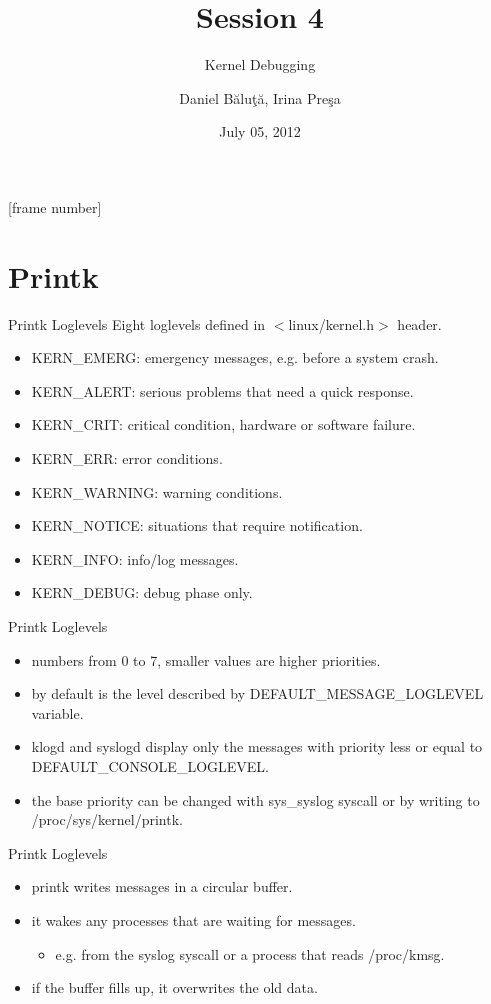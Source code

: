 \documentclass{workshop}
\title[Session 4]{Session 4}
\subtitle{Kernel Debugging}
\author{Daniel Băluţă, Irina Preşa}
\date{July 05, 2012}
\begin{document}
[frame number]

\frame{\titlepage}

\section{Printk}
\begin{frame}{Printk Loglevels}
Eight loglevels defined in $<$linux/kernel.h$>$ header.

\begin{itemize}
\item KERN\_EMERG: emergency messages, e.g. before a system crash.
\item KERN\_ALERT: serious problems that need a quick response.
\item KERN\_CRIT: critical condition, hardware or software failure.
\item KERN\_ERR: error conditions.
\item KERN\_WARNING: warning conditions.
\item KERN\_NOTICE: situations that require notification.
\item KERN\_INFO: info/log messages.
\item KERN\_DEBUG: debug phase only.
\end{itemize}
\end{frame}

\begin{frame}{Printk Loglevels}
\begin{itemize}
\item numbers from 0 to 7, smaller values are higher priorities.
\item by default is the level described by DEFAULT\_MESSAGE\_LOGLEVEL
variable.
\item klogd and syslogd display only the messages with priority less or equal
to DEFAULT\_CONSOLE\_LOGLEVEL.
\item the base priority can be changed with sys\_syslog syscall or by writing
to /proc/sys/kernel/printk.
\end{itemize}
\end{frame}

\begin{frame}{Printk Loglevels}
\begin{itemize}
\item printk writes messages in a circular buffer.
\item it wakes any processes that are waiting for messages.
\begin{itemize}
\item e.g. from the syslog syscall or a process that reads /proc/kmsg.
\end{itemize}
\item if the buffer fills up, it overwrites the old data.
\end{itemize}
\end{frame}
\end{document}
